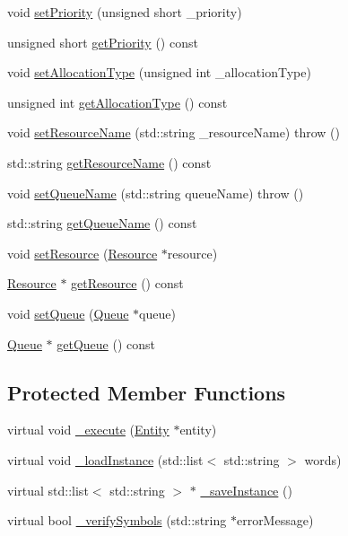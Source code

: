 \begin{DoxyCompactItemize}
\item 
void \hyperlink{class_seize_aa9c7a856ef519696526192a06dab9551}{set\+Priority} (unsigned short \+\_\+priority)
\item 
unsigned short \hyperlink{class_seize_aae382dc1d1d3dc9a3de927cc9d7811c9}{get\+Priority} () const 
\item 
void \hyperlink{class_seize_a4f6354bf4897ce4c46ff9c1e2dd5c150}{set\+Allocation\+Type} (unsigned int \+\_\+allocation\+Type)
\item 
unsigned int \hyperlink{class_seize_ac40f22e56d4448c5d5bae40b64ef4deb}{get\+Allocation\+Type} () const 
\item 
void \hyperlink{class_seize_a2bdaa616c4fd499f754099eb59729547}{set\+Resource\+Name} (std\+::string \+\_\+resource\+Name)  throw ()
\item 
std\+::string \hyperlink{class_seize_a30781601e8fcfb165c99aee731c081e8}{get\+Resource\+Name} () const 
\item 
void \hyperlink{class_seize_adadd376a826f2b3a84176242dd9a15ca}{set\+Queue\+Name} (std\+::string queue\+Name)  throw ()
\item 
std\+::string \hyperlink{class_seize_a37f2b1a10e1ae390d5186a87bdebe30a}{get\+Queue\+Name} () const 
\item 
void \hyperlink{class_seize_a00358422896770f637a3ab4f916fbb01}{set\+Resource} (\hyperlink{class_resource}{Resource} $\ast$resource)
\item 
\hyperlink{class_resource}{Resource} $\ast$ \hyperlink{class_seize_a69f42d0b8a6ce26c210c8b7cb927b405}{get\+Resource} () const 
\item 
void \hyperlink{class_seize_a474f5050620ea1733f9cdc9eda5f3d47}{set\+Queue} (\hyperlink{class_queue}{Queue} $\ast$queue)
\item 
\hyperlink{class_queue}{Queue} $\ast$ \hyperlink{class_seize_aa09d1a08f966e187ec70d161a1cd496f}{get\+Queue} () const 
\end{DoxyCompactItemize}
\subsection*{Protected Member Functions}
\begin{DoxyCompactItemize}
\item 
virtual void \hyperlink{class_seize_a96f6517a40b3bfd0d5ea753d59cef797}{\+\_\+execute} (\hyperlink{class_entity}{Entity} $\ast$entity)
\item 
virtual void \hyperlink{class_seize_a421a0ec6382cb30f6a0342f8dea050db}{\+\_\+load\+Instance} (std\+::list$<$ std\+::string $>$ words)
\item 
virtual std\+::list$<$ std\+::string $>$ $\ast$ \hyperlink{class_seize_a38a8af6942b51ce11d191469d277661d}{\+\_\+save\+Instance} ()
\item 
virtual bool \hyperlink{class_seize_a51dc9257dc692083006f676546ddfff8}{\+\_\+verify\+Symbols} (std\+::string $\ast$error\+Message)
\end{DoxyCompactItemize}
